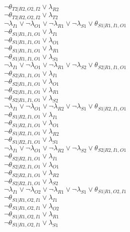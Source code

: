 $\neg\theta_{T2|R2,O2,I2} \vee \lambda_{R2}$\\
$\neg\theta_{T2|R2,O2,I2} \vee \lambda_{T2}$\\
$\neg\lambda_{I1} \vee \neg\lambda_{O1} \vee \neg\lambda_{R1} \vee \neg\lambda_{S1} \vee \theta_{S1|R1,I1,O1}$\\
$\neg\theta_{S1|R1,I1,O1} \vee \lambda_{I1}$\\
$\neg\theta_{S1|R1,I1,O1} \vee \lambda_{O1}$\\
$\neg\theta_{S1|R1,I1,O1} \vee \lambda_{R1}$\\
$\neg\theta_{S1|R1,I1,O1} \vee \lambda_{S1}$\\
$\neg\lambda_{I1} \vee \neg\lambda_{O1} \vee \neg\lambda_{R1} \vee \neg\lambda_{S2} \vee \theta_{S2|R1,I1,O1}$\\
$\neg\theta_{S2|R1,I1,O1} \vee \lambda_{I1}$\\
$\neg\theta_{S2|R1,I1,O1} \vee \lambda_{O1}$\\
$\neg\theta_{S2|R1,I1,O1} \vee \lambda_{R1}$\\
$\neg\theta_{S2|R1,I1,O1} \vee \lambda_{S2}$\\
$\neg\lambda_{I1} \vee \neg\lambda_{O1} \vee \neg\lambda_{R2} \vee \neg\lambda_{S1} \vee \theta_{S1|R2,I1,O1}$\\
$\neg\theta_{S1|R2,I1,O1} \vee \lambda_{I1}$\\
$\neg\theta_{S1|R2,I1,O1} \vee \lambda_{O1}$\\
$\neg\theta_{S1|R2,I1,O1} \vee \lambda_{R2}$\\
$\neg\theta_{S1|R2,I1,O1} \vee \lambda_{S1}$\\
$\neg\lambda_{I1} \vee \neg\lambda_{O1} \vee \neg\lambda_{R2} \vee \neg\lambda_{S2} \vee \theta_{S2|R2,I1,O1}$\\
$\neg\theta_{S2|R2,I1,O1} \vee \lambda_{I1}$\\
$\neg\theta_{S2|R2,I1,O1} \vee \lambda_{O1}$\\
$\neg\theta_{S2|R2,I1,O1} \vee \lambda_{R2}$\\
$\neg\theta_{S2|R2,I1,O1} \vee \lambda_{S2}$\\
$\neg\lambda_{I1} \vee \neg\lambda_{O2} \vee \neg\lambda_{R1} \vee \neg\lambda_{S1} \vee \theta_{S1|R1,O2,I1}$\\
$\neg\theta_{S1|R1,O2,I1} \vee \lambda_{I1}$\\
$\neg\theta_{S1|R1,O2,I1} \vee \lambda_{O2}$\\
$\neg\theta_{S1|R1,O2,I1} \vee \lambda_{R1}$\\
$\neg\theta_{S1|R1,O2,I1} \vee \lambda_{S1}$\\
